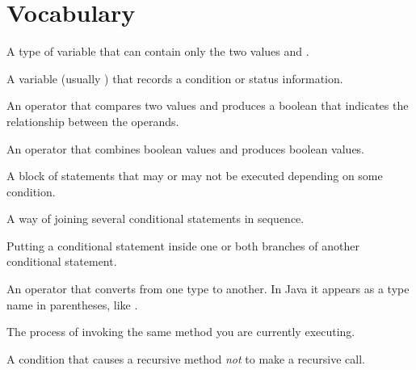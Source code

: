 \section{Vocabulary}

\begin{description}

A type of variable that can contain only the two values  and .

A variable (usually ) that records a condition or status information.

An operator that compares two values and produces a boolean that indicates the relationship between the operands.

An operator that combines boolean values and produces boolean values.

A block of statements that may or may not be executed depending on some condition.

A way of joining several conditional statements in sequence.

Putting a conditional statement inside one or both branches of another conditional statement.

An operator that converts from one type to another.
In Java it appears as a type name in parentheses, like .

The process of invoking the same method you are currently executing.

A condition that causes a recursive method {\em not} to make a recursive call.

\end{description}
